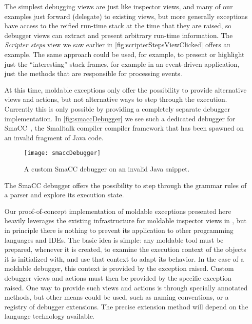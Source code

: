 \documentclass[sigplan,anonymous,review,10pt]{acmart}
\newcommand\on[1]{\nbc{ON}{#1}{olive}} %
\newcommand{\GT}{\lst{GT}\xspace} %
\begin{document}
The simplest debugging views are just like inspector views, and many of our examples just forward (delegate) to existing views, but more generally exceptions have access to the reified run-time stack at the time that they are raised, so debugger views can extract and present arbitrary run-time information.
The \emph{Scripter steps} view we saw earlier in \autoref{fig:scripterStepsViewClicked} offers an example.
The same approach could be used, for example, to present or highlight just the ``interesting'' stack frames, for example in an event-driven application, just the methods that are responsible for processing events.

At this time, moldable exceptions only offer the possibility to provide alternative views and actions, but not alternative ways to step through the execution.
Currently this is only possible by providing a completely separate debugger implementation.
In \autoref{fig:smaccDebugger} we see such a dedicated debugger for SmaCC~\cite{Brant17a}, the Smalltalk compiler compiler framework that has been spawned on an invalid fragment of Java code.
\begin{figure}[h]
  \texttt{[image: smaccDebugger]}
  \caption{A custom SmaCC debugger on an invalid Java snippet.}
  \label{fig:smaccDebugger}
\end{figure}
The SmaCC debugger offers the possibility to step through the grammar rules of a parser and explore its execution state.


Our proof-of-concept implementation of moldable exceptions presented here heavily leverages the existing infrastructure for moldable inspector views in \GT, but in principle there is nothing to prevent its application to other programming languages and IDEs.
The basic idea is simple: any moldable tool must be prepared, whenever it is created, to examine the execution context of the objects it is initialized with, and use that context to adapt its behavior.
In the case of a moldable debugger, this context is provided by the exception raised.
Custom debugger views and actions must then be provided by the specific exception raised.
One way to provide such views and actions is through specially annotated methods, but other means could be used, such as naming conventions, or a registry of debugger extensions.
The precise extension method will depend on the language technology available.
\end{document}
